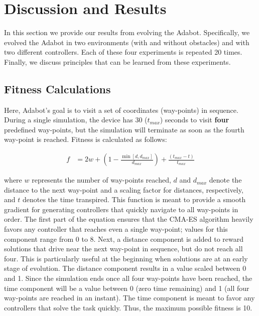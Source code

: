 \section{Discussion and Results}
\label{sec:results}

In this section we provide our results from evolving the Adabot.
%
Specifically, we evolved the Adabot in two environments (with and without obstacles) and with two different controllers. Each of these four experiments is repeated 20 times.
%
Finally, we discuss principles that can be learned from these experiments.


\subsection{Fitness Calculations}

%
Here, Adabot's goal is to visit a set of coordinates (way-points) in sequence.
%
During a single simulation, the device has 30 ($t_\mathit{max}$) seconds to visit \textbf{four} predefined way-points, but the simulation will terminate as soon as the fourth way-point is reached.
%
Fitness is calculated as follows:


\begin{align}
    f &= 2w + (1-\frac{\min[d, d_\mathit{max}]}{d_\mathit{max}}) + \frac{(t_\mathit{max} - t)}{t_\mathit{max}}
\end{align}

\noindent
where $w$ represents the number of way-points reached, $d$ and $d_\mathit{max}$ denote the distance to the next way-point and a scaling factor for distances, respectively, and $t$ denotes the time transpired.
%
This function is meant to provide a smooth gradient for generating controllers that quickly navigate to all way-points in order.
%
The first part of the equation ensures that the CMA-ES algorithm heavily favors any controller that reaches even a single way-point; values for this component range from 0 to 8.
%
Next, a distance component is added to reward solutions that drive near the next way-point in sequence, but do not reach all four. This is particularly useful at the beginning when solutions are at an early stage of evolution.
%
The distance component results in a value scaled between 0 and 1.
%
Since the simulation ends once all four way-points have been reached, the time component will be a value between 0 (zero time remaining) and 1 (all four way-points are reached in an instant).
%
The time component is meant to favor any controllers that solve the task quickly.
%
Thus, the maximum possible fitness is 10.


